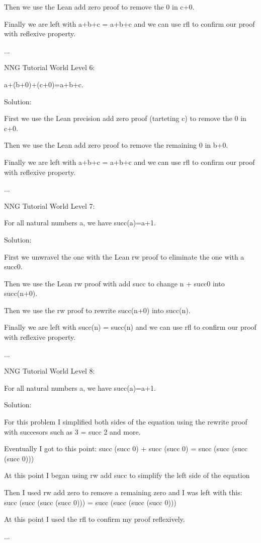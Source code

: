 \documentclass{article}
\theoremstyle{theorem}
\theoremstyle{definition}
\theoremstyle{remark}
\begin{document}
Then we use the Lean add zero proof to remove the 0 in c+0.

Finally we are left with a+b+c = a+b+c and we can use rfl to confirm our proof with reflexive property.

...

NNG Tutorial World Level 6:

a+(b+0)+(c+0)=a+b+c.

Solution: 

First we use the Lean precision add zero proof (tarteting c) to remove the 0 in c+0.

Then we use the Lean add zero proof to remove the remaining 0 in b+0.

Finally we are left with a+b+c = a+b+c and we can use rfl to confirm our proof with reflexive property.

...

NNG Tutorial World Level 7:

For all natural numbers a, we have succ(a)=a+1.

Solution: 

First we unwravel the one with the Lean rw proof to eliminate the one with a succ0.

Then we use the Lean rw proof with add succ to change n + succ0 into succ(n+0).

Then we use the rw proof to rewrite succ(n+0) into succ(n).

Finally we are left with succ(n) = succ(n) and we can use rfl to confirm our proof with reflexive property.

...

NNG Tutorial World Level 8:

For all natural numbers a, we have succ(a)=a+1.

Solution: 

For this problem I simplified both sides of the equation using the rewrite proof with succesors such as 3 = succ 2 and more.

Eventually I got to this point: succ (succ 0) + succ (succ 0) = succ (succ (succ (succ 0)))

At this point I began using rw add succ to simplify the left side of the equation

Then I used rw add zero to remove a remaining zero and I was left with this: succ (succ (succ (succ 0))) = succ (succ (succ (succ 0)))

At this point I used the rfl to confirm my proof reflexively.

...
\end{document}
